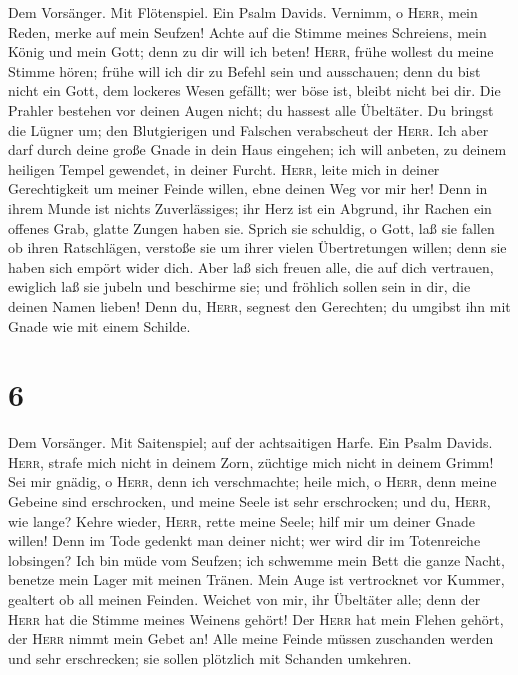  Dem Vorsänger. Mit Flötenspiel. Ein Psalm Davids.
Vernimm, o \textsc{Herr}, mein Reden, merke auf mein Seufzen!
 Achte auf die Stimme meines Schreiens, mein König und
mein Gott; denn zu dir will ich beten!  \textsc{Herr},
frühe wollest du meine Stimme hören; frühe will ich dir zu Befehl sein
und ausschauen;  denn du bist nicht ein Gott, dem lockeres
Wesen gefällt; wer böse ist, bleibt nicht bei dir.  Die
Prahler bestehen vor deinen Augen nicht; du hassest alle Übeltäter.
 Du bringst die Lügner um; den Blutgierigen und Falschen
verabscheut der \textsc{Herr}.  Ich aber darf durch deine
große Gnade in dein Haus eingehen; ich will anbeten, zu deinem heiligen
Tempel gewendet, in deiner Furcht.  \textsc{Herr}, leite
mich in deiner Gerechtigkeit um meiner Feinde willen, ebne deinen Weg
vor mir her!  Denn in ihrem Munde ist nichts
Zuverlässiges; ihr Herz ist ein Abgrund, ihr Rachen ein offenes Grab,
glatte Zungen haben sie.  Sprich sie schuldig, o Gott,
laß sie fallen ob ihren Ratschlägen, verstoße sie um ihrer vielen
Übertretungen willen; denn sie haben sich empört wider dich.
 Aber laß sich freuen alle, die auf dich vertrauen,
ewiglich laß sie jubeln und beschirme sie; und fröhlich sollen sein in
dir, die deinen Namen lieben!  Denn du, \textsc{Herr},
segnest den Gerechten; du umgibst ihn mit Gnade wie mit einem Schilde.

\hypertarget{section-5}{%
\section{6}\label{section-5}}

 Dem Vorsänger. Mit Saitenspiel; auf der achtsaitigen
Harfe. Ein Psalm Davids. \textsc{Herr}, strafe mich nicht in deinem
Zorn, züchtige mich nicht in deinem Grimm!  Sei mir
gnädig, o \textsc{Herr}, denn ich verschmachte; heile mich, o
\textsc{Herr}, denn meine Gebeine sind erschrocken,  und
meine Seele ist sehr erschrocken; und du, \textsc{Herr}, wie lange?
 Kehre wieder, \textsc{Herr}, rette meine Seele; hilf mir
um deiner Gnade willen!  Denn im Tode gedenkt man deiner
nicht; wer wird dir im Totenreiche lobsingen?  Ich bin
müde vom Seufzen; ich schwemme mein Bett die ganze Nacht, benetze mein
Lager mit meinen Tränen.  Mein Auge ist vertrocknet vor
Kummer, gealtert ob all meinen Feinden.  Weichet von mir,
ihr Übeltäter alle; denn der \textsc{Herr} hat die Stimme meines Weinens
gehört!  Der \textsc{Herr} hat mein Flehen gehört, der
\textsc{Herr} nimmt mein Gebet an!  Alle meine Feinde
müssen zuschanden werden und sehr erschrecken; sie sollen plötzlich mit
Schanden umkehren.

